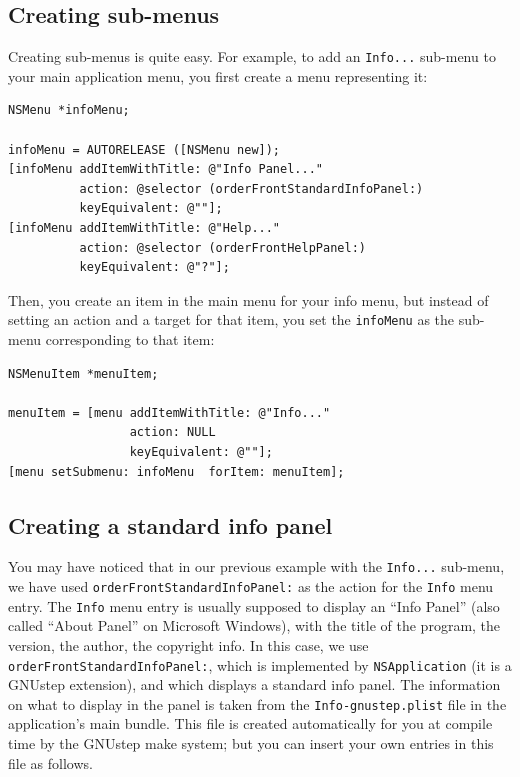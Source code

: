 \documentclass[a4paper]{article}
\begin{document}
\subsection{Creating sub-menus}
Creating sub-menus is quite easy.  For example, to add an
\texttt{Info...} sub-menu to your main application menu, you first
create a menu representing it:
\begin{verbatim}
NSMenu *infoMenu;

infoMenu = AUTORELEASE ([NSMenu new]);
[infoMenu addItemWithTitle: @"Info Panel..." 
          action: @selector (orderFrontStandardInfoPanel:) 
          keyEquivalent: @""];
[infoMenu addItemWithTitle: @"Help..." 
          action: @selector (orderFrontHelpPanel:)
          keyEquivalent: @"?"];
\end{verbatim}
Then, you create an item in the main menu for your info menu, but
instead of setting an action and a target for that item, you set the
\texttt{infoMenu} as the sub-menu corresponding to that item:
\begin{verbatim}
NSMenuItem *menuItem;

menuItem = [menu addItemWithTitle: @"Info..." 
                 action: NULL 
                 keyEquivalent: @""];
[menu setSubmenu: infoMenu  forItem: menuItem];
\end{verbatim}

\subsection{Creating a standard info panel}
You may have noticed that in our previous example with the
\texttt{Info...}  sub-menu, we have used
\texttt{orderFrontStandardInfoPanel:} as the action for the
\texttt{Info} menu entry.  The \texttt{Info} menu entry is usually
supposed to display an ``Info Panel'' (also called ``About Panel'' on
Microsoft Windows), with the title of the program, the version, the
author, the copyright info.  In this case, we use
\texttt{orderFrontStandardInfoPanel:}, which is implemented by
\texttt{NSApplication} (it is a GNUstep extension), and which displays
a standard info panel.  The information on what to display in the
panel is taken from the \texttt{Info-gnustep.plist} file in the
application's main bundle.  This file is created automatically for you
at compile time by the GNUstep make system; but you can insert your
own entries in this file as follows.
\end{document}
